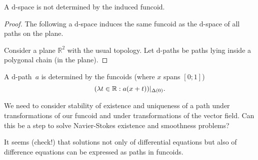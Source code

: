 \begin{example}
A $\mathrm{d}$-space is not determined by the induced funcoid.
\end{example}

\begin{proof}
The following a $\mathrm{d}$-space induces the same funcoid as the $\mathrm{d}$-space of all paths on the plane.

Consider a plane $\mathbb{R}^2$ with the usual topology. Let $\mathrm{d}$-paths be paths lying inside a polygonal chain (in the plane).
\end{proof}

\begin{conjecture}
A $\mathrm{d}$-path~$a$ is determined by the funcoids (where $x$ spans $[0;1]$)
\[ (\lambda t\in\mathbb{R}:a(x+t))|_{\Delta(0)}. \]
\end{conjecture}

We need to consider stability of existence and uniqueness of a path under transformations of our funcoid and
under transformations of the vector field. Can this be a step to solve Navier-Stokes existence and smoothness problems?

It seems (check!) that solutions not only of differential equations but also of difference equations can be
expressed as paths in funcoids.